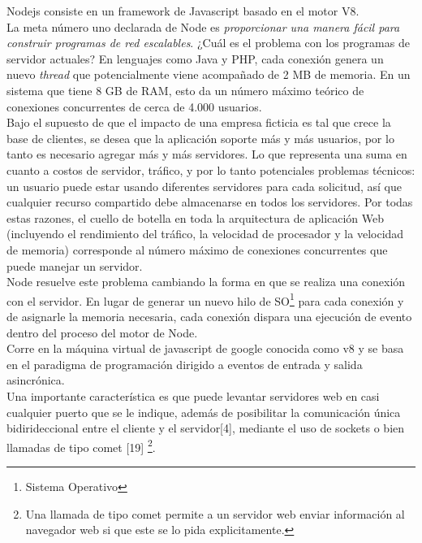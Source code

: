 Nodejs consiste en un framework de Javascript basado en el motor V8.\\

La meta número uno declarada de Node es \textit{proporcionar una manera fácil para construir 
programas de red escalables}. ¿Cuál es el problema con los programas de servidor actuales? 
En lenguajes como Java y PHP, cada conexión genera un nuevo \textit{thread} que potencialmente viene 
acompañado de 2 MB de memoria. En un sistema que tiene 8 GB de RAM, esto da un número máximo teórico 
de conexiones concurrentes de cerca de 4.000 usuarios.\\

Bajo el supuesto de que el impacto de una empresa ficticia es tal que crece la base de clientes, se desea 
que la aplicación soporte más y más usuarios, por lo tanto es necesario agregar más y más servidores.
Lo que representa una suma en cuanto a costos de servidor, tráfico, y por lo tanto potenciales
problemas técnicos: un usuario puede estar usando diferentes servidores para cada solicitud, así que cualquier 
recurso compartido debe almacenarse en todos los servidores. Por todas estas razones, el cuello de botella en 
toda la arquitectura de aplicación Web (incluyendo el rendimiento del tráfico, la velocidad de procesador y la 
velocidad de memoria) corresponde al número máximo de conexiones concurrentes que puede manejar un servidor.\\

Node resuelve este problema cambiando la forma en que se realiza una conexión con el servidor. En lugar de 
generar un nuevo hilo de SO\footnote{Sistema Operativo} para cada conexión y de asignarle la memoria necesaria, 
cada conexión dispara una ejecución de evento dentro del proceso del motor de Node.\\

Corre en la máquina virtual de javascript de google conocida como v8 y se basa en el paradigma
de programación dirigido a eventos de entrada y salida asincrónica.\\

Una importante característica es que puede levantar servidores web en casi cualquier puerto que se 
le indique, además de posibilitar la comunicación única bidirideccional entre el cliente y el servidor[4],
mediante el uso de sockets o bien llamadas de tipo comet [19] \footnote{Una llamada de tipo comet 
permite a un servidor web enviar información al navegador web si que este se lo pida explicitamente.}.


